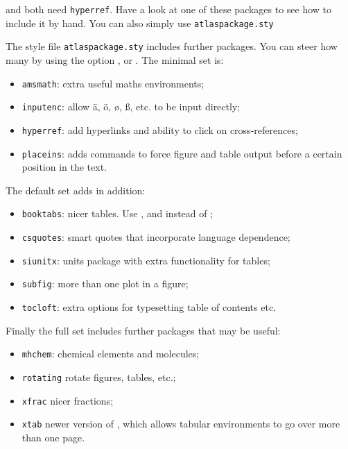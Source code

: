  and  both need \texttt{hyperref}. 
Have a look at one of these packages to see how to include it by hand.
You can also simply use \texttt{atlaspackage.sty}

The style file \texttt{atlaspackage.sty} includes further packages.
You can steer how many by using the option ,  or .
The minimal set is:
\begin{itemize}\setlength{\parskip}{0pt}\setlength{\itemsep}{0pt}
\item \texttt{amsmath}: extra useful maths environments;
\item \texttt{inputenc}: allow ä, ö, ø, ß, etc. to be input directly;
\item \texttt{hyperref}: add hyperlinks and ability to click on cross-references;
\item \texttt{placeins}: adds commands to force figure and table output before a certain position in the text.
\end{itemize}

The default set adds in addition:
\begin{itemize}\setlength{\parskip}{0pt}\setlength{\itemsep}{0pt}
\item \texttt{booktabs}: nicer tables. Use ,  and  instead of ;
\item \texttt{csquotes}: smart quotes that incorporate language dependence;
\item \texttt{siunitx}: units package with extra functionality for tables;
\item \texttt{subfig}: more than one plot in a figure;
\item \texttt{tocloft}: extra options for typesetting table of contents etc.
\end{itemize}

Finally the full set includes further packages that may be useful:
\begin{itemize}\setlength{\parskip}{0pt}\setlength{\itemsep}{0pt}
\item \texttt{mhchem}: chemical elements and molecules;
\item \texttt{rotating} rotate figures, tables, etc.;
\item \texttt{xfrac} nicer fractions;
\item \texttt{xtab} newer version of , which allows tabular environments to go over more than one page.
\end{itemize}

